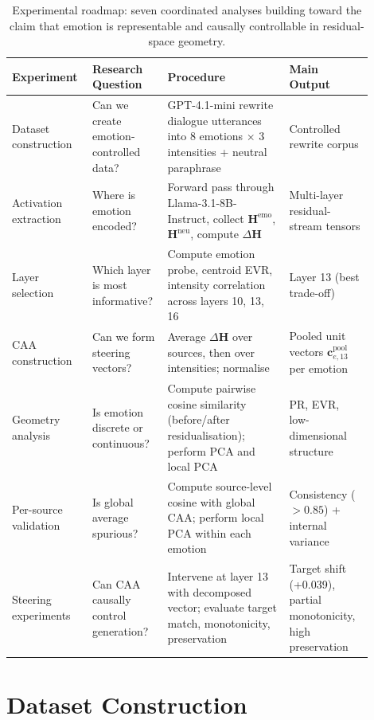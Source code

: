 \begin{table}[H]
\centering
\small
\begin{tabular}{p{0.18\linewidth} p{0.18\linewidth} p{0.32\linewidth} p{0.22\linewidth}}
\toprule
\textbf{Experiment} & \textbf{Research Question} & \textbf{Procedure} & \textbf{Main Output} \\
\midrule
Dataset construction & Can we create emotion-controlled data? & GPT-4.1-mini rewrite dialogue utterances into 8 emotions $\times$ 3 intensities + neutral paraphrase & Controlled rewrite corpus \\
\midrule
Activation extraction & Where is emotion encoded? & Forward pass through Llama-3.1-8B-Instruct, collect $\mathbf{H}^{\mathrm{emo}}$, $\mathbf{H}^{\mathrm{neu}}$, compute $\Delta\mathbf{H}$ & Multi-layer residual-stream tensors \\
\midrule
Layer selection & Which layer is most informative? & Compute emotion probe, centroid EVR, intensity correlation across layers 10, 13, 16 & Layer 13 (best trade-off) \\
\midrule
CAA construction & Can we form steering vectors? & Average $\Delta\mathbf{H}$ over sources, then over intensities; normalise & Pooled unit vectors $\mathbf{c}^{\mathrm{pool}}_{e,13}$ per emotion \\
\midrule
Geometry analysis & Is emotion discrete or continuous? & Compute pairwise cosine similarity (before/after residualisation); perform PCA and local PCA & PR, EVR, low-dimensional structure \\
\midrule
Per-source validation & Is global average spurious? & Compute source-level cosine with global CAA; perform local PCA within each emotion & Consistency ($>0.85$) + internal variance \\
\midrule
Steering experiments & Can CAA causally control generation? & Intervene at layer 13 with decomposed vector; evaluate target match, monotonicity, preservation & Target shift (+0.039), partial monotonicity, high preservation \\
\bottomrule
\end{tabular}
\caption{Experimental roadmap: seven coordinated analyses building toward the claim that emotion is representable and causally controllable in residual-space geometry.}
\label{tab:experimental_roadmap}
\end{table}

\section{Dataset Construction}

